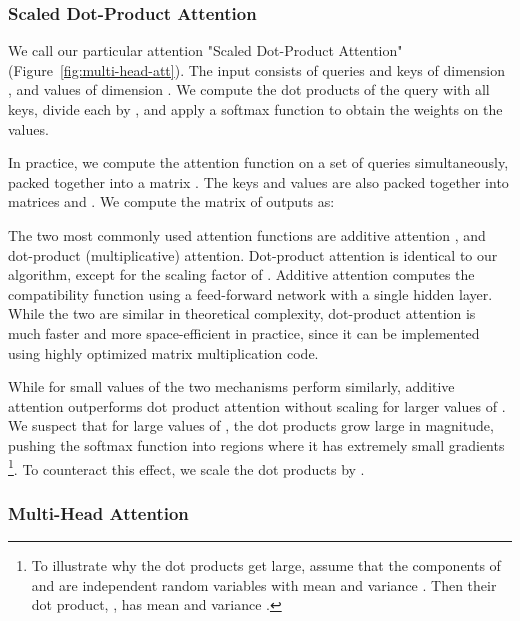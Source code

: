 \documentclass{article}
\begin{document}
\subsubsection{Scaled Dot-Product Attention} \label{sec:scaled-dot-prod}



We call our particular attention "Scaled Dot-Product Attention" (Figure~\ref{fig:multi-head-att}).   The input consists of queries and keys of dimension , and values of dimension .  We compute the dot products of the query with all keys, divide each by , and apply a softmax function to obtain the weights on the values.

In practice, we compute the attention function on a set of queries simultaneously, packed together into a matrix .   The keys and values are also packed together into matrices  and .  We compute the matrix of outputs as:



The two most commonly used attention functions are additive attention \citep{bahdanau2014neural}, and dot-product (multiplicative) attention.  Dot-product attention is identical to our algorithm, except for the scaling factor of . Additive attention computes the compatibility function using a feed-forward network with a single hidden layer.  While the two are similar in theoretical complexity, dot-product attention is much faster and more space-efficient in practice, since it can be implemented using highly optimized matrix multiplication code. 







While for small values of  the two mechanisms perform similarly, additive attention outperforms dot product attention without scaling for larger values of  \citep{DBLP:journals/corr/BritzGLL17}. We suspect that for large values of , the dot products grow large in magnitude, pushing the softmax function into regions where it has extremely small gradients  \footnote{To illustrate why the dot products get large, assume that the components of  and  are independent random variables with mean  and variance .  Then their dot product, , has mean  and variance .}. To counteract this effect, we scale the dot products by .





\subsubsection{Multi-Head Attention} \label{sec:multihead}
\end{document}
